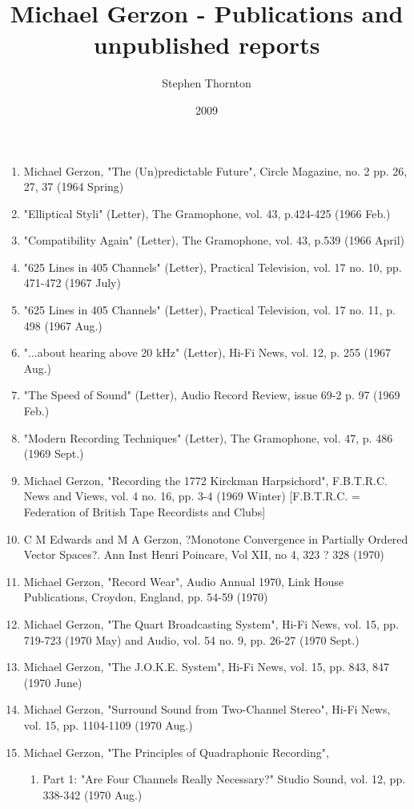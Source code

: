 \documentclass[9pt]{amsart}
\title{Michael Gerzon - Publications and unpublished reports}
\author{Stephen Thornton}
\date{2009} %
\begin{document}
\maketitle

\begin{enumerate}
\item Michael Gerzon, "The (Un)predictable Future", Circle Magazine, no. 2 pp. 26, 27, 37 (1964 Spring)
\item "Elliptical Styli" (Letter), The Gramophone, vol. 43, p.424-425 (1966 Feb.)
\item "Compatibility Again" (Letter), The Gramophone, vol. 43, p.539 (1966 April)
\item "625 Lines in 405 Channels" (Letter), Practical Television, vol. 17 no. 10, pp. 471-472 (1967 July)
\item "625 Lines in 405 Channels" (Letter), Practical Television, vol. 17 no. 11, p. 498 (1967 Aug.)
\item "...about hearing above 20 kHz" (Letter), Hi-Fi News, vol. 12, p. 255 (1967 Aug.)
\item "The Speed of Sound" (Letter), Audio Record Review, issue 69-2 p. 97 (1969 Feb.)
\item "Modern Recording Techniques" (Letter), The Gramophone, vol. 47, p. 486 (1969 Sept.)
\item Michael Gerzon, "Recording the 1772 Kirckman Harpsichord", F.B.T.R.C. News and Views, vol. 4 no. 16, pp. 3-4 (1969 Winter) [F.B.T.R.C. = Federation of British Tape Recordists and Clubs]
\item C M Edwards and M A Gerzon, ?Monotone Convergence in Partially Ordered Vector Spaces?. Ann Inst Henri Poincare, Vol XII, no 4, 323 ? 328 (1970)
\item Michael Gerzon, "Record Wear", Audio Annual 1970, Link House Publications, Croydon, England, pp. 54-59 (1970)
\item Michael Gerzon, "The Quart Broadcasting System", Hi-Fi News, vol. 15, pp. 719-723 (1970 May) and Audio, vol. 54 no. 9, pp. 26-27 (1970 Sept.)
\item Michael Gerzon, "The J.O.K.E. System", Hi-Fi News, vol. 15, pp. 843, 847 (1970 June)
\item Michael Gerzon, "Surround Sound from Two-Channel Stereo", Hi-Fi News, vol. 15, pp. 1104-1109 (1970 Aug.)
\item Michael Gerzon, "The Principles of Quadraphonic Recording",
	\begin{enumerate}
	\item Part 1: "Are Four Channels Really Necessary?" Studio Sound, vol. 12, pp. 338-342 (1970 Aug.)

\end{enumerate}
\end{enumerate}
\end{document}
